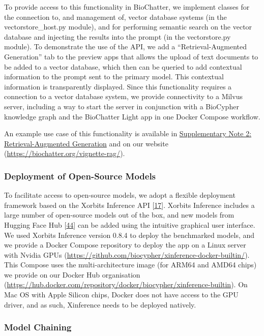 To provide access to this functionality in BioChatter, we implement classes for the connection to, and management of, vector database systems (in the vectorstore\_host.py module), and for performing semantic search on the vector database and injecting the results into the prompt (in the vectorstore.py module).
To demonstrate the use of the API, we add a ``Retrieval-Augmented Generation'' tab to the preview apps that allows the upload of text documents to be added to a vector database, which then can be queried to add contextual information to the prompt sent to the primary model.
This contextual information is transparently displayed.
Since this functionality requires a connection to a vector database system, we provide connectivity to a Milvus server, including a way to start the server in conjunction with a BioCypher knowledge graph and the BioChatter Light app in one Docker Compose workflow.

An example use case of this functionality is available in \protect\hyperlink{supplementary-note-2-retrieval-augmented-generation}{Supplementary Note 2: Retrieval-Augmented Generation} and on our website (\url{https://biochatter.org/vignette-rag/}).

\hypertarget{deployment-of-open-source-models}{%
\subsubsection{Deployment of Open-Source Models}\label{deployment-of-open-source-models}}

To facilitate access to open-source models, we adopt a flexible deployment framework based on the Xorbits Inference API {[}\protect\hyperlink{ref-mGEvmJGA}{17}{]}.
Xorbits Inference includes a large number of open-source models out of the box, and new models from Hugging Face Hub {[}\protect\hyperlink{ref-12p6amlLS}{44}{]} can be added using the intuitive graphical user interface.
We used Xorbits Inference version 0.8.4 to deploy the benchmarked models, and we provide a Docker Compose repository to deploy the app on a Linux server with Nvidia GPUs (\url{https://github.com/biocypher/xinference-docker-builtin/}).
This Compose uses the multi-architecture image (for ARM64 and AMD64 chips) we provide on our Docker Hub organisation (\url{https://hub.docker.com/repository/docker/biocypher/xinference-builtin}).
On Mac OS with Apple Silicon chips, Docker does not have access to the GPU driver, and as such, Xinference needs to be deployed natively.

\hypertarget{model-chaining}{%
\subsubsection{Model Chaining}\label{model-chaining}}

